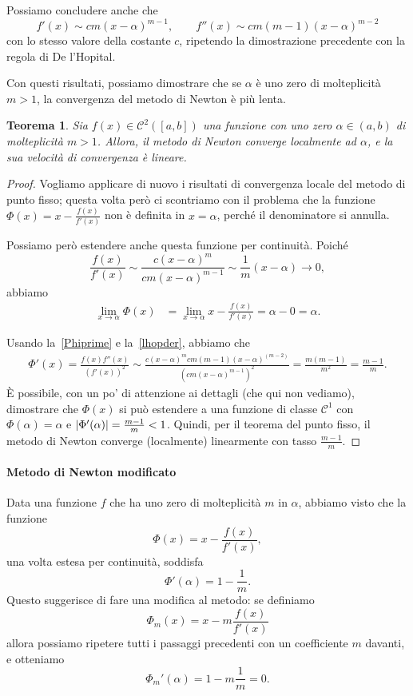 \documentclass[a4paper]{report}
\DeclarePairedDelimiter{\abs}{\lvert}{\rvert}
\newtheorem{theorem}{Teorema}[chapter]
\theoremstyle{definiton}
\theoremstyle{remark}
\begin{document}
Possiamo concludere anche che
\begin{equation} \label{lhopder}
    f'(x) \sim cm (x-\alpha)^{m-1}, \quad \quad f''(x) \sim cm(m-1)(x-\alpha)^{m-2}
\end{equation} 
con lo stesso valore della costante $c$, ripetendo la dimostrazione precedente con la regola di De l'Hopital.

Con questi risultati, possiamo dimostrare che se $\alpha$ è uno zero di molteplicità $m>1$, la convergenza del metodo di Newton è più lenta.
\begin{theorem}
    Sia $f(x) \in \mathcal{C}^2([a,b])$ una funzione con uno zero $\alpha \in (a,b)$ di molteplicità $m>1$.
    Allora, il metodo di Newton converge localmente ad $\alpha$, e la sua velocità di convergenza è lineare.
\end{theorem}
\begin{proof}
Vogliamo applicare di nuovo i risultati di convergenza locale del metodo di punto fisso; questa volta però ci scontriamo con il problema che la funzione $\Phi(x) = x - \frac{f(x)}{f'(x)}$ non è definita in $x=\alpha$, perché il denominatore si annulla.

Possiamo però estendere anche questa funzione per continuità. Poiché
\[
    \frac{f(x)}{f'(x)} \sim \frac{c(x-\alpha)^m}{cm(x-\alpha)^{m-1}} \sim \frac{1}{m}(x-\alpha) \to 0,
\]
abbiamo
\begin{align*}
    \lim_{x\to\alpha} \Phi(x) &= \lim_{x\to\alpha} x - \frac{f(x)}{f'(x)} = \alpha - 0 = \alpha.
\end{align*}

Usando la~\eqref{Phiprime} e la~\eqref{lhopder}, abbiamo che
\begin{align*}
    \Phi'(x) = \frac{f(x)f''(x)}{(f'(x))^2} \sim \frac{c(x-\alpha)^m cm(m-1)(x-\alpha)^{(m-2)}}{(cm(x-\alpha)^{m-1})^2} = \frac{m(m-1)}{m^2} = \frac{m-1}{m}.
\end{align*}
È possibile, con un po' di attenzione ai dettagli (che qui non vediamo), dimostrare che $\Phi(x)$ si può estendere a una funzione di classe $\mathcal{C}^1$ con $\Phi(\alpha)=\alpha$ e $\abs{\Phi'(\alpha)} = \frac{m-1}{m} < 1$. Quindi, per il teorema del punto fisso, il metodo di Newton converge (localmente) linearmente con tasso $\frac{m-1}{m}$.
\end{proof}

\paragraph{Metodo di Newton modificato} Data una funzione $f$ che ha uno zero di molteplicità $m$ in $\alpha$, abbiamo visto che la funzione
\[
    \Phi(x) = x - \frac{f(x)}{f'(x)},
\]
una volta estesa per continuità, soddisfa
\[
    \Phi'(\alpha) = 1 - \frac{1}{m}.
\]
Questo suggerisce di fare una modifica al metodo: se definiamo
\[
    \Phi_m(x) = x - m \frac{f(x)}{f'(x)}
\]
allora possiamo ripetere tutti i passaggi precedenti con un coefficiente $m$ davanti, e otteniamo
\[
    \Phi_m'(\alpha) = 1 - m\frac{1}{m} = 0.
\]
\end{document}
